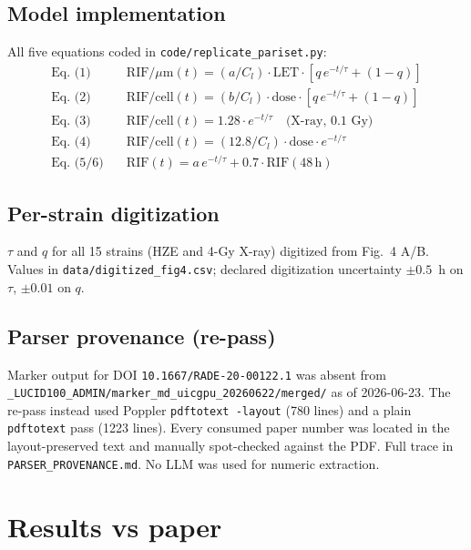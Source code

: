 \documentclass[11pt]{article}
\begin{document}
\subsection{Model implementation}
All five equations coded in \texttt{code/replicate\_pariset.py}:
\begin{align}
\text{Eq. (1)} \quad & \text{RIF}/\mu\text{m}(t) = (a/C_l)\cdot \text{LET}\cdot [q\,e^{-t/\tau} + (1-q)] \\
\text{Eq. (2)} \quad & \text{RIF}/\text{cell}(t) = (b/C_l)\cdot \text{dose}\cdot [q\,e^{-t/\tau} + (1-q)] \\
\text{Eq. (3)} \quad & \text{RIF}/\text{cell}(t) = 1.28 \cdot e^{-t/\tau} \quad \text{(X-ray, 0.1 Gy)} \\
\text{Eq. (4)} \quad & \text{RIF}/\text{cell}(t) = (12.8/C_l)\cdot \text{dose}\cdot e^{-t/\tau} \\
\text{Eq. (5/6)} \quad & \text{RIF}(t) = a\,e^{-t/\tau} + 0.7\cdot \text{RIF}(48\,\text{h})
\end{align}

\subsection{Per-strain digitization}
$\tau$ and $q$ for all 15 strains (HZE and 4-Gy X-ray) digitized from Fig.~4 A/B.
Values in \texttt{data/digitized\_fig4.csv}; declared digitization uncertainty
$\pm 0.5$~h on $\tau$, $\pm 0.01$ on $q$.

\subsection{Parser provenance (re-pass)}
Marker output for DOI \texttt{10.1667/RADE-20-00122.1} was absent from
\texttt{\_LUCID100\_ADMIN/marker\_md\_uicgpu\_20260622/merged/} as of 2026-06-23.
The re-pass instead used Poppler \texttt{pdftotext -layout} (780 lines) and a plain
\texttt{pdftotext} pass (1223 lines). Every consumed paper number was located in the
layout-preserved text and manually spot-checked against the PDF. Full trace in
\texttt{PARSER\_PROVENANCE.md}. No LLM was used for numeric extraction.

\section{Results vs paper}
\end{document}
